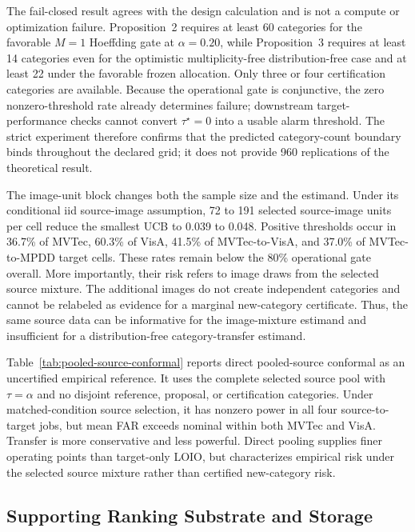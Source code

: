 The fail-closed result agrees with the design calculation and is not a compute or optimization failure. Proposition~2 requires at least 60 categories for the favorable $M=1$ Hoeffding gate at $\alpha=0.20$, while Proposition~3 requires at least 14 categories even for the optimistic multiplicity-free distribution-free case and at least 22 under the favorable frozen allocation. Only three or four certification categories are available. Because the operational gate is conjunctive, the zero nonzero-threshold rate already determines failure; downstream target-performance checks cannot convert $\tau^\star=0$ into a usable alarm threshold. The strict experiment therefore confirms that the predicted category-count boundary binds throughout the declared grid; it does not provide 960 replications of the theoretical result.

The image-unit block changes both the sample size and the estimand. Under its conditional iid source-image assumption, 72 to 191 selected source-image units per cell reduce the smallest UCB to 0.039 to 0.048. Positive thresholds occur in 36.7\% of MVTec, 60.3\% of VisA, 41.5\% of MVTec-to-VisA, and 37.0\% of MVTec-to-MPDD target cells. These rates remain below the 80\% operational gate overall. More importantly, their risk refers to image draws from the selected source mixture. The additional images do not create independent categories and cannot be relabeled as evidence for a marginal new-category certificate. Thus, the same source data can be informative for the image-mixture estimand and insufficient for a distribution-free category-transfer estimand.

Table~\ref{tab:pooled-source-conformal} reports direct pooled-source conformal as an uncertified empirical reference. It uses the complete selected source pool with $\tau=\alpha$ and no disjoint reference, proposal, or certification categories. Under matched-condition source selection, it has nonzero power in all four source-to-target jobs, but mean FAR exceeds nominal within both MVTec and VisA. Transfer is more conservative and less powerful. Direct pooling supplies finer operating points than target-only LOIO, but characterizes empirical risk under the selected source mixture rather than certified new-category risk.

\subsection{Supporting Ranking Substrate and Storage}



